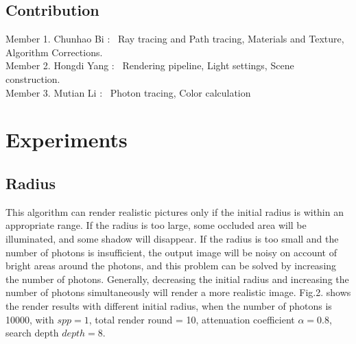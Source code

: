 \documentclass[acmtog]{acmart}
\begin{document}
	\subsection{Contribution}
	Member 1. Chunhao Bi  : \ Ray tracing and Path tracing, Materials and Texture, Algorithm Corrections.\\ 
	Member 2. Hongdi Yang : \ Rendering pipeline, Light settings, Scene construction.\\
	Member 3. Mutian Li   : \ Photon tracing, Color calculation

\section{Experiments}
	\subsection{Radius}
	This algorithm can render realistic pictures only if the initial radius is within an appropriate range. 
	If the radius is too large, some occluded area will be illuminated, and some shadow will disappear. 
	If the radius is too small and the number of photons is insufficient, the output image will be noisy on account of bright areas around the photons, 
	and this problem can be solved by increasing the number of photons. 
	Generally, decreasing the initial radius and increasing the number of photons simultaneously will render a more realistic image. 
	Fig.2. shows the render results with different initial radius, when the number of photons is 10000, with $spp = 1$, total render round = 10, attenuation coefficient $\alpha = 0.8$, search depth $depth = 8$.
\end{document}

